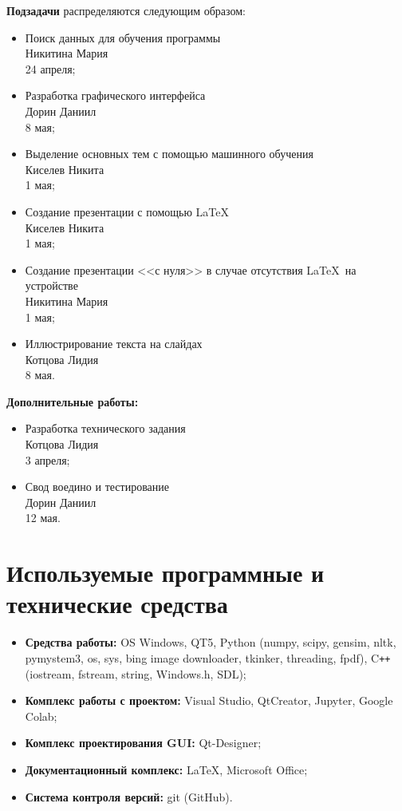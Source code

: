   \textbf{Подзадачи} распределяются следующим образом:
  \begin{itemize}
    \item Поиск данных для обучения программы \\ Никитина Мария \\ 24 апреля;
    \item Разработка графического интерфейса \\ Дорин Даниил \\ 8 мая;
    \item Выделение основных тем с помощью машинного обучения \\ Киселев Никита \\ 1 мая;
    \item Создание презентации с помощью \LaTeX \\ Киселев Никита \\ 1 мая;
    \item Создание презентации <<с нуля>> в случае отсутствия \LaTeX~на устройстве \\ Никитина Мария \\ 1 мая;
    \item Иллюстрирование текста на слайдах \\ Котцова Лидия \\ 8 мая.
  \end{itemize}

  \textbf{Дополнительные работы:}
  \begin{itemize}
    \item Разработка технического задания \\ Котцова Лидия \\ 3 апреля;
    \item Свод воедино и тестирование \\ Дорин Даниил \\ 12 мая.
  \end{itemize}

  \section{Используемые программные и технические средства}

  \begin{itemize}
    \item \textbf{Средства работы:} OS Windows, QT5, Python (numpy, scipy, gensim, nltk, pymystem3, 
    os, sys, bing image downloader, tkinker, threading, fpdf), C\texttt{++} (iostream, fstream, string, 
    Windows.h, SDL);
    \item \textbf{Комплекс работы с проектом:} Visual Studio, QtCreator, Jupyter, Google Colab;
    \item \textbf{Комплекс проектирования GUI:} Qt-Designer;
    \item \textbf{Документационный комплекс:} \LaTeX, Microsoft Office;
    \item \textbf{Система контроля версий:} git (GitHub).
  \end{itemize}

